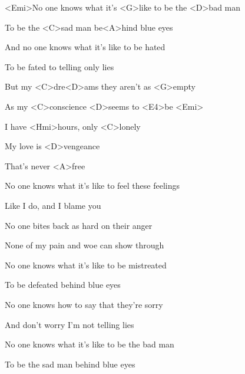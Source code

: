 

\zs
<Emi>No one knows what it's <G>like
to be the <D>bad man

To be the <C>sad man
be<A>hind blue eyes

And no one knows
what it's like to be hated

To be fated to telling only lies
\ks

\zr
But my <C>dre<D>ams they aren't as <G>empty

As my <C>conscience <D>seems to <E4>be <Emi>

I have <Hmi>hours, only <C>lonely

My love is <D>vengeance

That's never <A>free
\kr

\zs
No one knows what it's like
to feel these feelings

Like I do, and I blame you

No one bites back as hard on their anger

None of my pain and woe can show through
\ks

\zr \kr

\zs
No one knows what it's like
to be mistreated

To be defeated behind blue eyes

No one knows how to say that they're sorry

And don't worry I'm not telling lies
\ks

\zr \kr

\zs
No one knows what it's like
to be the bad man

To be the sad man
behind blue eyes
\ks

\kp
